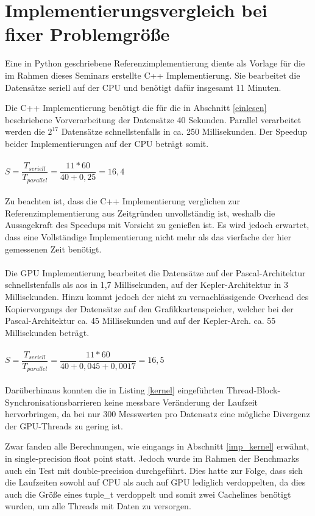 \section{Implementierungsvergleich bei fixer Problemgröße}
Eine in Python geschriebene Referenzimplementierung diente als Vorlage für die im Rahmen dieses Seminars erstellte C++ Implementierung. Sie bearbeitet die Datensätze seriell auf der CPU und benötigt dafür insgesamt 11 Minuten.

Die C++ Implementierung benötigt die für die in Abschnitt \ref{einlesen} beschriebene Vorverarbeitung der Datensätze 40 Sekunden. Parallel verarbeitet werden die $2^{17}$ Datensätze schnellstenfalls in ca. 250 Millisekunden.
Der Speedup beider Implementierungen auf der CPU beträgt somit.
\\\\
$S = \dfrac{T_{seriell}}{T_{parallel}} = \dfrac{11*60}{40+0,25} = 16,4$
\\\\
Zu beachten ist, dass die C++ Implementierung verglichen zur Referenzimplementierung aus Zeitgründen unvollständig ist, weshalb die Aussagekraft des Speedups mit Vorsicht zu genießen ist. Es wird jedoch erwartet, dass eine Vollständige Implementierung nicht mehr als das vierfache der hier gemessenen Zeit benötigt.
\\\\
Die GPU Implementierung bearbeitet die Datensätze auf der Pascal-Architektur schnellstenfalls als \gls{aos} in 1,7 Millisekunden, auf der Kepler-Architektur in 3 Millisekunden. Hinzu kommt jedoch der nicht zu vernachlässigende Overhead des Kopiervorgangs der Datensätze auf den Grafikkartenspeicher, welcher bei der Pascal-Architektur ca. 45 Millisekunden und auf der Kepler-Arch. ca. 55 Millisekunden beträgt.
\\\\
$S = \dfrac{T_{seriell}}{T_{parallel}} = \dfrac{11*60}{40+0,045+0,0017} = 16,5$
\\\\
Darüberhinaus konnten die in Listing \ref{kernel} eingeführten Thread-Block-Synchronisationsbarrieren keine messbare Veränderung der Laufzeit hervorbringen, da bei nur 300 Messwerten pro Datensatz eine mögliche Divergenz der GPU-Threads zu gering ist.

Zwar fanden alle Berechnungen, wie eingangs in Abschnitt \ref{imp_kernel} erwähnt, in single-precision float point statt. Jedoch wurde im Rahmen der Benchmarks auch ein Test mit double-precision durchgeführt. Dies hatte zur Folge, dass sich die Laufzeiten sowohl auf CPU als auch auf GPU lediglich verdoppelten, da dies auch die Größe eines tuple\_t verdoppelt und somit zwei Cachelines benötigt wurden, um alle Threads mit Daten zu versorgen.

